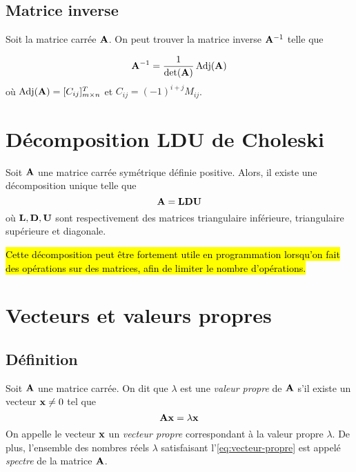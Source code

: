 \documentclass[12pt, french]{report}
\begin{document}
\subsection{Matrice inverse}
\label{ssec:matrice-inverse}
Soit la matrice carrée $\mathbf{A}$. On peut trouver la matrice inverse $\mathbf{A}^{-1}$ telle que

\begin{equation}
\label{eq:mat-inverse}
\mathbf{A}^{-1} = \frac{1}{\det(\mathbf{A})} \operatorname{Adj}(\mathbf{A})
\end{equation}
où $\operatorname{Adj}(\mathbf{A})   = [C_{ij}]_{m \times n}^T$ et  $C_{ij}   = (-1)^{i+j} M_{ij}$.


\section{Décomposition LDU de Choleski}
Soit $\mathbf{A}$ une matrice carrée symétrique définie positive. Alors, il existe une décomposition unique telle que
\begin{equation}
\label{eq:decomp-choleski}
\mathbf{A} = \mathbf{LDU}
\end{equation}
où $\mathbf{L, D, U}$ sont respectivement des matrices triangulaire inférieure, triangulaire supérieure et diagonale.

\hl{Cette décomposition peut être fortement utile en programmation lorsqu'on fait des opérations sur des matrices, afin de limiter le nombre d'opérations.}

\section{Vecteurs et valeurs propres}
\subsection{Définition}
Soit $\mathbf{A}$ une matrice carrée. On dit que $\lambda$ est une \textit{valeur propre} de $\mathbf{A}$ s'il existe un vecteur $\mathbf{x} \neq 0$ tel que
\begin{equation}
\label{eq:vecteur-propre}
\mathbf{Ax = \lambda x}
\end{equation}
On appelle le vecteur $\mathbf{x}$ un \textit{vecteur propre} correspondant à la valeur propre $\lambda$. De plus, l'ensemble des nombres réels $\lambda$ satisfaisant l'\autoref{eq:vecteur-propre} est appelé \textit{spectre} de la matrice $\mathbf{A}$.
\end{document}
